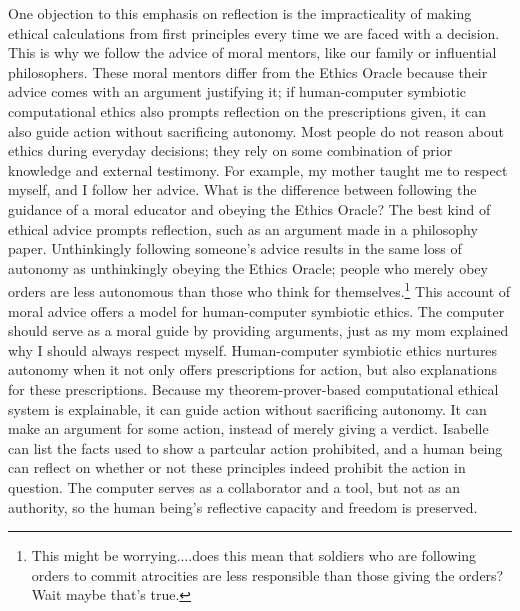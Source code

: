 \begin{isabellebody}
\begin{isamarkuptext}
One objection to this emphasis on reflection is the impracticality of making ethical calculations from first principles 
every time we are faced with a decision. This is why we follow the advice of moral mentors, like our 
family or influential philosophers. These moral mentors differ from the Ethics Oracle because their advice 
comes with an argument justifying it; if human-computer symbiotic computational ethics also prompts 
reflection on the prescriptions given, it can also guide action without sacrificing autonomy.
Most people do not reason about ethics during everyday decisions; they rely on some combination of 
prior knowledge and external testimony. For example, my mother taught me to respect myself, and I 
follow her advice. What is the difference between following the guidance of a moral educator and 
obeying the Ethics Oracle? The best kind of ethical advice prompts reflection, such as an argument 
made in a philosophy paper. Unthinkingly following someone’s advice results in the same loss of 
autonomy as unthinkingly obeying the Ethics Oracle; people who merely obey orders are less autonomous 
than those who think for themselves.\footnote{This might be worrying....does this mean that soldiers who are
following orders to commit atrocities are less responsible than those giving the orders? Wait 
maybe that's true.} This account of moral advice offers a model for human-computer 
symbiotic ethics. The computer should serve as a moral guide by providing arguments, just as my mom 
explained why I should always respect myself. Human-computer symbiotic 
ethics nurtures autonomy when it not only offers prescriptions for action, but also explanations for 
these prescriptions. Because my theorem-prover-based computational ethical system is explainable, it can 
guide action without sacrificing autonomy. It can make an argument for some action, instead of 
merely giving a verdict. Isabelle can list the facts used to show
a partcular action prohibited, and a human being can reflect on whether or not these principles
indeed prohibit the action in question. The computer serves as a collaborator and a tool, but not as an authority, 
so the human being’s reflective capacity and freedom is preserved.%
\end{isamarkuptext}\isamarkuptrue%
%
\isadelimdocument
%
\endisadelimdocument
%
\isatagdocument
%
\isamarkuptrue%
%
\endisatagdocument
{\isafolddocument}%
%
\isadelimdocument
%
\endisadelimdocument
%
\begin{isamarkuptext}%

\end{isamarkuptext}
\end{isabellebody}
